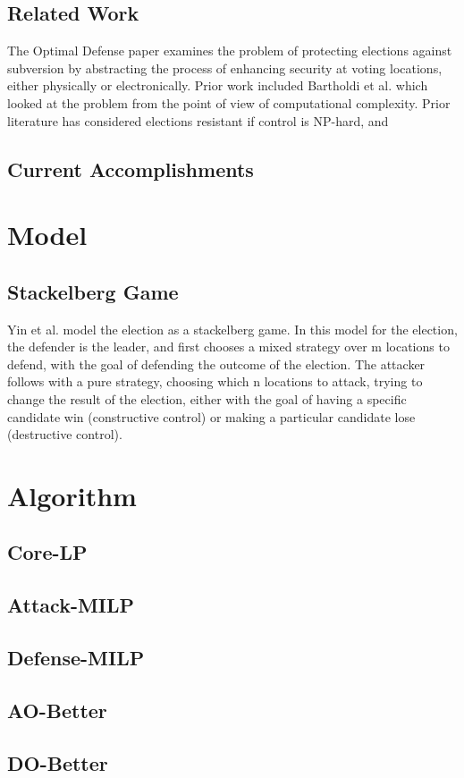 \documentclass[letterpaper]{article} %
\begin{document}
\subsection{Related Work}
The Optimal Defense paper examines the problem of protecting elections against subversion by abstracting the process of enhancing security at voting locations, either physically or electronically. Prior work included Bartholdi et al. which looked at the problem from the point of view of computational complexity. Prior literature has considered elections resistant if control is NP-hard, and
\subsection{Current Accomplishments}

\section{Model}
\subsection{Stackelberg Game}
Yin et al. model the election as a stackelberg game. In this model for the election, the defender is the leader, and first chooses a mixed strategy over m locations to defend,  with the goal of defending the outcome of the election. The attacker follows with a pure strategy, choosing which n locations to attack, trying to change the result of the election, either with the goal of having a specific candidate win (constructive control) or making a particular candidate lose (destructive control). 
\section{Algorithm}
\subsection{Core-LP}
\subsection{Attack-MILP}
\subsection{Defense-MILP}
\subsection{AO-Better}
\subsection{DO-Better}
\end{document}

